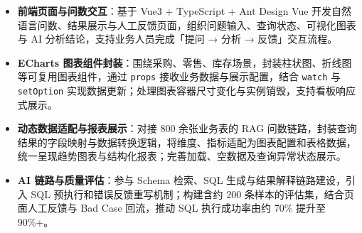 \documentclass[10pt]{article}
\begin{document}
    \vspace{0.18em}

    
    
    \begin{itemize}
        \item \textbf{前端页面与问数交互}：基于 Vue3 + TypeScript + Ant Design Vue 开发自然语言问数、结果展示与人工反馈页面，组织问题输入、查询状态、可视化图表与 AI 分析结论，支持业务人员完成「提问 → 分析 → 反馈」交互流程。
    
        \item \textbf{ECharts 图表组件封装}：围绕采购、零售、库存场景，封装柱状图、折线图等可复用图表组件，通过 \texttt{props} 接收业务数据与展示配置，结合 \texttt{watch} 与 \texttt{setOption} 实现数据更新；处理图表容器尺寸变化与实例销毁，支持看板响应式展示。
    
        \item \textbf{动态数据适配与报表展示}：对接 800 余张业务表的 RAG 问数链路，封装查询结果的字段映射与数据转换逻辑，将维度、指标适配为图表配置和表格数据，统一呈现趋势图表与结构化报表；完善加载、空数据及查询异常状态展示。
    
        \item \textbf{AI 链路与质量评估}：参与 Schema 检索、SQL 生成与结果解释链路建设，引入 SQL 预执行和错误反馈重写机制；构建含约 200 条样本的评估集，结合页面人工反馈与 Bad Case 回流，推动 SQL 执行成功率由约 70\% 提升至 90\%+。
    \end{itemize}
\end{document}
